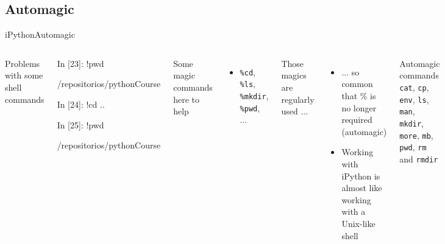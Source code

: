 \documentclass[10pt,compress]{beamer} %
\begin{document}
\subsection{Automagic}

\begin{frame}[fragile]{iPython}{Automagic}
	\begin{columns}
	Problems with some shell commands
	\begin{exampleblock}{}
In [23]: !pwd

/repositorios/pythonCourse


In [24]: !cd ..


In [25]: !pwd

/repositorios/pythonCourse
	\end{exampleblock}
	Some magic commands here to help
	\begin{itemize}
		\item \texttt{\%cd}, \texttt{\%ls}, \texttt{\%mkdir}, \texttt{\%pwd}, ...
	\end{itemize}

	Those magics are regularly used ...
	\begin{itemize}
		\item ... so common that \% is no longer required (automagic)
		\item Working with iPython is almost like working with a Unix-like shell
	\end{itemize}
	\footnotesize{
	\begin{block}{\footnotesize{Automagic commands}}
\texttt{cat}, \texttt{cp}, \texttt{env}, \texttt{ls}, \texttt{man}, \texttt{mkdir}, \texttt{more}, \texttt{mb}, \texttt{pwd}, \texttt{rm} and \texttt{rmdir}
	\end{block}
	}
	\end{columns}

\end{frame}
\end{document}
